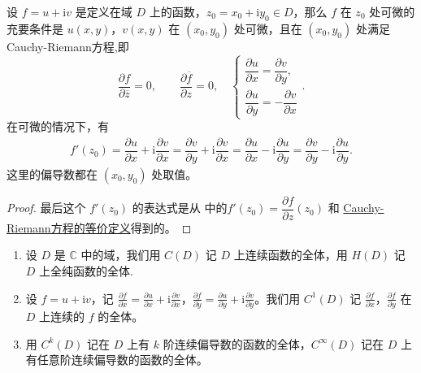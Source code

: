 \documentclass[../../main.tex]{subfiles}
\begin{document}
\begin{theorem}\label{theorem:复变函数可微的充要条件2}
设 \( f = u + \mathrm{i}v \) 是定义在域 \( D \) 上的函数，\( z_0 = x_0 + \mathrm{i}y_0 \in D \)，那么 \( f \) 在 \( z_0 \) 处可微的充要条件是 \( u(x, y) \)，\( v(x, y) \) 在 \( (x_0, y_0) \) 处可微，且在 \( (x_0, y_0) \) 处满足Cauchy-Riemann方程,即
\[
\frac{\partial f}{\partial \overline{z}} = 0,\quad \quad \frac{\partial \overline{f}}{\partial z}=0,\quad \begin{cases}
\dfrac{\partial u}{\partial x} = \dfrac{\partial v}{\partial y}, \\
\dfrac{\partial u}{\partial y} = -\dfrac{\partial v}{\partial x}
\end{cases}.
\]
在可微的情况下，有
\begin{align*}
f'(z_0) = \dfrac{\partial u}{\partial x} + \mathrm{i}\dfrac{\partial v}{\partial x}
= \dfrac{\partial v}{\partial y} + \mathrm{i}\dfrac{\partial v}{\partial x} = \dfrac{\partial u}{\partial x} - \mathrm{i}\dfrac{\partial u}{\partial y} = \dfrac{\partial v}{\partial y} - \mathrm{i}\dfrac{\partial u}{\partial y}.
\end{align*}
这里的偏导数都在 \( (x_0, y_0) \) 处取值。
\end{theorem}
\begin{proof}
最后这个 \( f'(z_0) \) 的表达式是从 中的\( f'(z_0) = \dfrac{\partial f}{\partial z}(z_0) \) 和 \hyperref[proposition:Cauchy-Riemann方程的等价定义]{Cauchy-Riemann方程的等价定义}得到的。

\end{proof}

\begin{definition}
\begin{enumerate}
\item 设 \( D \) 是 \( \mathbb{C} \) 中的域，我们用 \( C(D) \) 记 \( D \) 上连续函数的全体，用 \( H(D) \) 记 \( D \) 上全纯函数的全体.

\item 设 \( f = u + \mathrm{i}v \)，记 \( \frac{\partial f}{\partial x} = \frac{\partial u}{\partial x} + \mathrm{i}\frac{\partial v}{\partial x} \)，\( \frac{\partial f}{\partial y} = \frac{\partial u}{\partial y} + \mathrm{i}\frac{\partial v}{\partial y} \)。我们用 \( C^1(D) \) 记 \( \frac{\partial f}{\partial x} \)，\( \frac{\partial f}{\partial y} \) 在 \( D \) 上连续的 \( f \) 的全体。

\item 用 \( C^k(D) \) 记在 \( D \) 上有 \( k \) 阶连续偏导数的函数的全体，\( C^\infty(D) \) 记在 \( D \) 上有任意阶连续偏导数的函数的全体。
\end{enumerate}
\end{definition}
\end{document}
